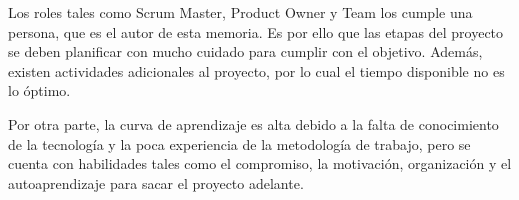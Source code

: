 Los roles tales como Scrum Master, Product Owner y Team los cumple una persona, que es el autor de esta memoria. Es por ello que las etapas del proyecto se deben planificar con mucho cuidado para cumplir con el objetivo. Además, existen actividades adicionales al proyecto, por lo cual el tiempo disponible no es lo óptimo.

Por otra parte, la curva de aprendizaje es alta debido a la falta de conocimiento de la tecnología y la poca experiencia de la metodología de trabajo, pero se cuenta con habilidades tales como el compromiso, la motivación, organización y el autoaprendizaje para sacar el proyecto adelante.
